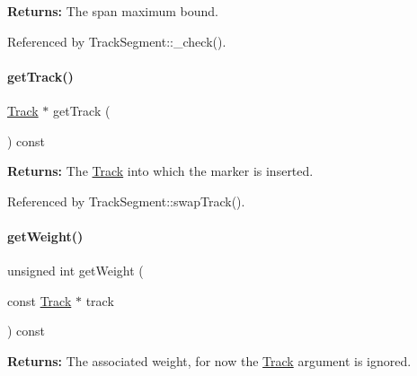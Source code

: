{\bfseries Returns\+:} The span maximum bound. 

Referenced by Track\+Segment\+::\+\_\+check().

\mbox{\label{classKite_1_1TrackMarker_a3f34f9139b8491a0adb531ac3a904171}} 
\paragraph{\texorpdfstring{get\+Track()}{getTrack()}}
{\footnotesize\ttfamily \hyperlink{classKite_1_1Track}{Track} $\ast$ get\+Track (\begin{DoxyParamCaption}{ }\end{DoxyParamCaption}) const\hspace{0.3cm}{\ttfamily [inline]}}

{\bfseries Returns\+:} The \hyperlink{classKite_1_1Track}{Track} into which the marker is inserted. 

Referenced by Track\+Segment\+::swap\+Track().

\mbox{\label{classKite_1_1TrackMarker_a26d951691a2c0f564a4ae842ba200ea5}} 
\paragraph{\texorpdfstring{get\+Weight()}{getWeight()}}
{\footnotesize\ttfamily unsigned int get\+Weight (\begin{DoxyParamCaption}\item[{const \hyperlink{classKite_1_1Track}{Track} $\ast$}]{track }\end{DoxyParamCaption}) const\hspace{0.3cm}{\ttfamily [inline]}}

{\bfseries Returns\+:} The associated weight, for now the \hyperlink{classKite_1_1Track}{Track} argument is ignored. \mbox{\label{classKite_1_1TrackMarker_abd3d8093f871d3d1a7f24b053648026c}} 

